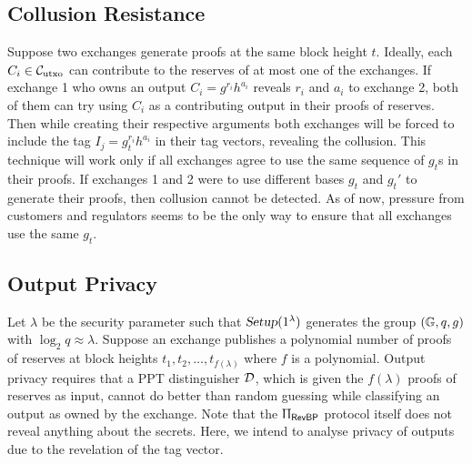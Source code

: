   \subsection{Collusion Resistance}
  \vspace{-4pt}
  Suppose two exchanges generate \RPlus proofs at the same block height $t$. Ideally, each $C_i \in \mathcal{C}_{\text{utxo}}$ can contribute to the reserves of at most one of the exchanges. If exchange 1 who owns an output $C_i = g^{r_i}h^{a_i}$ reveals $r_i$ and $a_i$ to exchange 2, both of them can try using $C_i$ as a contributing output in their proofs of reserves. Then while creating their respective arguments \proto both exchanges will be forced to include the tag $I_j = g_t^{r_i}h^{a_i}$ in their tag vectors, revealing the collusion. This technique will work only if all exchanges agree to use the same sequence of $g_t$s in their \RPlus proofs. If exchanges 1 and 2 were to use different bases $g_t$ and $g_t'$ to generate their proofs, then collusion cannot be detected. As of now, pressure from customers and regulators seems to be the only way to ensure that all exchanges use the same $g_t$.
  
  \subsection{Output Privacy}
  \vspace{-4pt}
  Let $\lambda$ be the security parameter such that $\textsl{Setup}(1^{\lambda})$ generates the group $(\mathbb{G}, q, g)$ with $\log_2 q \approx \lambda$. Suppose an exchange publishes a polynomial number of proofs of reserves at block heights $t_1, t_2, \ldots, t_{f(\lambda)}$ where $f$ is a polynomial.
  Output privacy requires that a \textsf{PPT} distinguisher $\mathcal{D}$, which is given the $f(\lambda)$ proofs of reserves as input, cannot do better than random guessing while classifying an output as owned by the exchange. 
  Note that the $\Uppi_{\textsf{RevBP}}$ protocol itself does not reveal anything about the secrets.
  Here, we intend to analyse privacy of outputs due to the revelation of the tag vector.  
  
